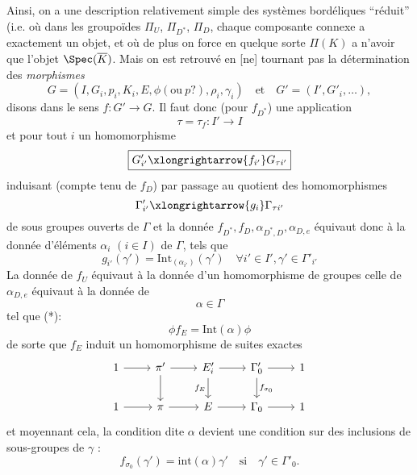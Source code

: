 Ainsi, on a une description relativement simple des systèmes bordéliques ``réduit'' (i.e. où dans les groupoïdes $\Pi_U$, $\Pi_{D^*}$, $\Pi_D$, chaque composante connexe a exactement un objet, et où de plus on force en quelque sorte $\Pi(K)$ a n'avoir que l'objet $\Spec(\overline{K})$. Mais on est retrouvé en [ne] tournant pas la détermination des \emph{morphismes}
$$
G = (I, G_i, p_i, K_i, E, \phi (\text{ou}~p?), \rho_i, \gamma_i) \quad \text{et} \quad G'= (I', G'_i,\dots),
$$
disons dans le sens $f: G' \to G$. Il faut donc (pour $f_{D^*}$) une application
$$
\boxed{\tau = \tau_f: I' \to I}
$$
et pour tout $i$ un homomorphisme 
$$
\boxed{G'_{i'} \xlongrightarrow{f_{i'}} G_{\tau i'}}
$$
induisant (compte tenu de $f_D$) par passage au quotient des homomorphismes
$$
\Gamma'_{i'} \xlongrightarrow{g_i} \Gamma_{\tau i'}
$$
de sous groupes ouverts de $\Gamma$ et la donnée $f_{D^*}, f_D, \alpha_{D^*, D}, \alpha_{D, e}$ équivaut donc à la donnée d'éléments $\alpha_i$ $(i \in I)$ de $\Gamma$, tels que 
$$
g_{i'}(\gamma') = \text{Int}_{(\alpha_{i'})}(\gamma') \quad \forall i' \in I', \gamma' \in \Gamma'_{i'}
$$
La donnée de $f_U$ équivaut à la donnée d'un homomorphisme de groupes celle de $\alpha_{D, e}$ équivaut à la donnée de
$$
\boxed{\alpha \in \Gamma}
$$
tel que (*):
\[
\phi f_E = \text{Int}(\alpha)\phi %
\]
de sorte que $f_E$ induit un homomorphisme de suites exactes
\[\begin{tikzcd}
	1 & {\pi'} & {E'_i} & {\Gamma'_0} & 1 \\
	1 & \pi & E & {\Gamma_0} & 1
	\arrow["{f_{\sigma_0}}", from=1-4, to=2-4]
	\arrow["{f_E}"', from=1-3, to=2-3]
	\arrow[from=1-3, to=1-4]
	\arrow[from=2-3, to=2-4]
	\arrow[from=2-2, to=2-3]
	\arrow[from=1-2, to=1-3]
	\arrow[from=1-2, to=2-2]
	\arrow[from=2-1, to=2-2]
	\arrow[from=1-1, to=1-2]
	\arrow[from=2-4, to=2-5]
	\arrow[from=1-4, to=1-5]
\end{tikzcd}\]
et moyennant cela, la condition dite $\alpha$ devient une condition sur des inclusions de sous-groupes de $\gamma$ :
$$
f_{\sigma_0}(\gamma') = \text{int}(\alpha)\gamma' \quad \text{si} \quad \gamma' \in \Gamma'_0.
$$

